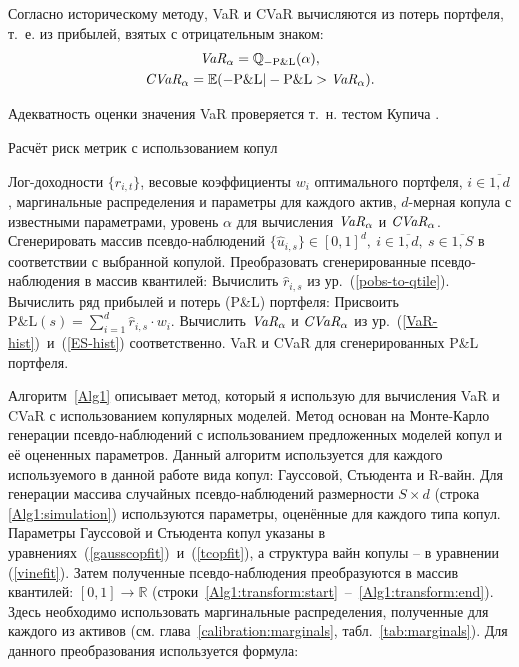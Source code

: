 Согласно историческому методу, VaR и CVaR вычисляются из потерь портфеля, т.~е. из прибылей, взятых с отрицательным знаком:
\begin{gather}
    \emph{VaR}_\alpha = \mathbb{Q}_{-\text{P\&L}}  (\alpha),
    \label{VaR-hist} \\
	\emph{CVaR}_\alpha = \mathbb{E} (-\text{P\&L}|-\text{P\&L} > \emph{VaR}_\alpha).
	\label{ES-hist}
\end{gather}

Адекватность оценки значения VaR проверяется т.~н. тестом Купича \cite{Kupiec95}.

\begin{algorithm}[t]
\caption{Расчёт риск метрик с использованием копул}
\label{Alg1}
\begin{algorithmic}[1]
	\Require Лог-доходности $\{r_{i,t}\}$, весовые коэффициенты $w_i$ оптимального портфеля, $i \in \overline{1,d}$, маргинальные распределения и параметры для каждого актив, $d$-мерная копула с известными параметрами, уровень $\alpha$ для вычисления $\emph{VaR}_\alpha$ и $\emph{CVaR}_\alpha$.
	\label{Alg1:input}
	\State Сгенерировать массив псевдо-наблюдений 
	$\{\hat{u}_{i,s}\} \in [0, 1]^d, \ i \in \overline{1,d}, \ s \in \overline{1, S}$ 
	в соответствии с выбранной копулой.\label{Alg1:simulation}
	\State Преобразовать сгенерированные псевдо-наблюдения в массив квантилей:
	\label{Alg1:transform:start}
	        \State Вычислить $\hat{r}_{i,s}$ из ур.~(\ref{pobs-to-qtile}). \label{Alg1:transform}
	    \EndFor
	\EndFor \label{Alg1:transform:end}
	\State Вычислить ряд прибылей и потерь (P\&L) портфеля:
	\State Присвоить $\text{P\&L}(s) = \sum_{i=1}^d \hat{r}_{i,s} \cdot w_i$. \label{Alg1:PnL}
	\EndFor
	\State Вычислить $\emph{VaR}_\alpha$ и $\emph{CVaR}_\alpha$ из ур.~(\ref{VaR-hist})~и~(\ref{ES-hist}) соответственно. \label{Alg1:risk-measures}
	\Ensure VaR и CVaR для сгенерированных P\&L портфеля.
\end{algorithmic}
\end{algorithm}

Алгоритм~\ref{Alg1} описывает метод, который я использую для вычисления VaR и CVaR с использованием копулярных моделей.
Метод основан на Монте-Карло генерации псевдо-наблюдений с использованием предложенных моделей копул и её оцененных параметров.
Данный алгоритм используется для каждого используемого в данной работе вида копул: Гауссовой, Стьюдента и R-вайн.
Для генерации массива случайных псевдо-наблюдений размерности $S \times d$ (строка \ref{Alg1:simulation}) используются параметры, оценённые для каждого типа копул.
Параметры Гауссовой и Стьюдента копул указаны в уравнениях~(\ref{gausscopfit})~и~(\ref{tcopfit}), а структура вайн копулы -- в уравнении (\ref{vinefit}).
Затем полученные псевдо-наблюдения преобразуются в массив квантилей: $[0,1] \to \mathbb{R}$ (строки~\ref{Alg1:transform:start}~--~\ref{Alg1:transform:end}). Здесь необходимо использовать маргинальные распределения, полученные для каждого из активов (см. глава~\ref{calibration:marginals}, табл.~\ref{tab:marginals}).
Для данного преобразования используется формула:

